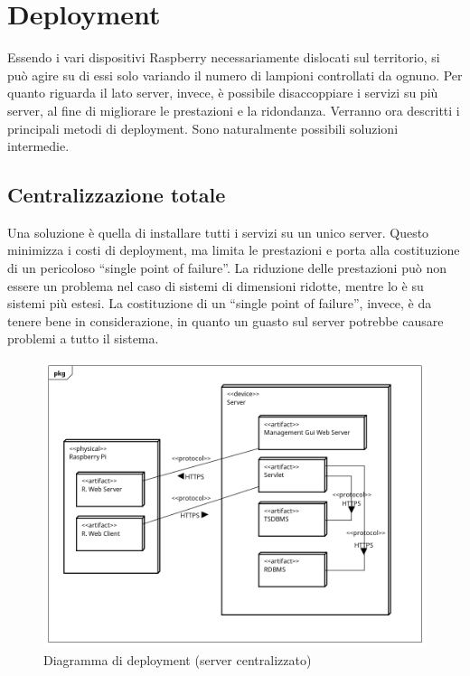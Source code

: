 \section{Deployment}
Essendo i vari dispositivi Raspberry necessariamente dislocati sul territorio, si può agire su di essi solo variando il numero di lampioni controllati da ognuno. Per quanto riguarda il lato server, invece, è possibile disaccoppiare i servizi su più server, al fine di migliorare le prestazioni e la ridondanza. Verranno ora descritti i principali metodi di deployment. Sono naturalmente possibili soluzioni intermedie.
\subsection{Centralizzazione totale}
Una soluzione è quella di installare tutti i servizi su un unico server. Questo minimizza i costi di deployment, ma limita le prestazioni e porta alla costituzione di un pericoloso ``single point of failure''. La riduzione delle prestazioni può non essere un problema nel caso di sistemi di dimensioni ridotte, mentre lo è su sistemi più estesi. La costituzione di un ``single point of failure'', invece, è da tenere bene in considerazione, in quanto un guasto sul server potrebbe causare problemi a tutto il sistema.
\begin{figure}[tbp]
	\centering
	\includegraphics[scale=.5]{figure/Deployment_Diagram_2.png}
	\caption{Diagramma di deployment (server centralizzato) \label{DD CENT}}
\end{figure}
